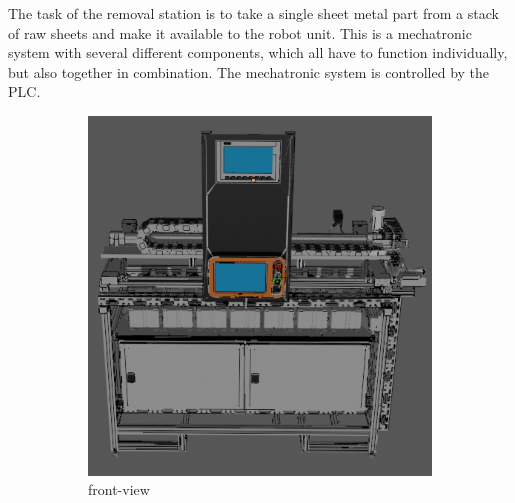 The task of the removal station is to take a single sheet metal part from a stack of raw sheets and make it
available to the robot unit. This is a mechatronic system with several different components, which all
have to function individually, but also together in combination. The mechatronic system is controlled by the PLC.


\begin{figure}[h]
    \centering
    \begin{subfigure}{0.505\textwidth}
        \centering
        \includegraphics[width=\textwidth]{figures/unloading-station-front-blender.png} %
        \caption{front-view}
        \label{fig:unloading-station-front}
    \end{subfigure}\hfill
    \begin{subfigure}{0.45\textwidth}
        \centering

\end{subfigure}
\end{figure}
